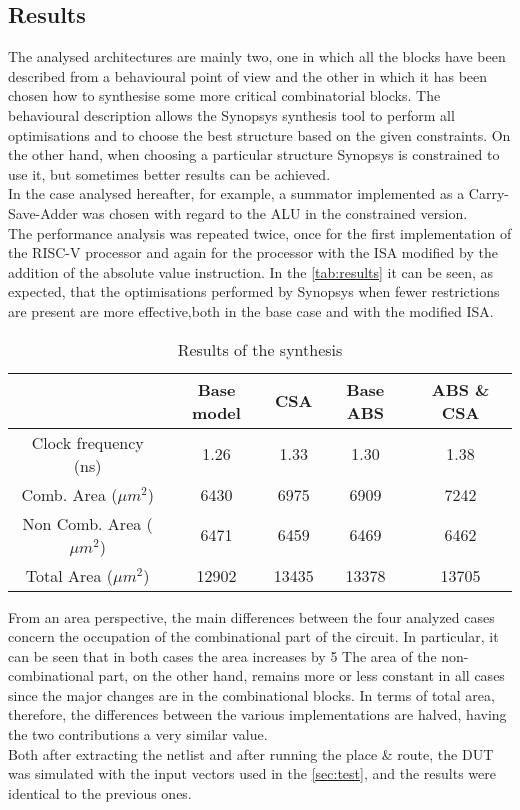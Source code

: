 \subsection{Results}
The analysed architectures are mainly two, one in which all the blocks have been described from a behavioural point of view and the other in which it has been chosen how to synthesise some more critical combinatorial blocks. The behavioural description allows the Synopsys synthesis tool to perform all optimisations and to choose the best structure based on the given constraints. On the other hand, when choosing a particular structure Synopsys is constrained to use it, but sometimes better results can be achieved.\\
In the case analysed hereafter, for example, a summator implemented as a Carry-Save-Adder was chosen with regard to the ALU in the constrained version.\\
The performance analysis was repeated twice, once for the first implementation of the RISC-V processor and again for the processor with the ISA modified by the addition of the absolute value instruction. In the \autoref{tab:results} it can be seen, as expected, that the optimisations performed by Synopsys when fewer restrictions are present are more effective,both in the base case and with the modified ISA.\\
\begin{table}[H]
	\centering
	\begin{tabular}{c|c|c||c|c}
		& Base model & CSA & Base ABS & ABS  \& CSA \\
		\hline
		Clock frequency (ns) & 1.26 & 1.33 & 1.30 & 1.38 \\
		Comb. Area ($\mu m^2$) & 6430 & 6975 & 6909 & 7242 \\
		Non Comb. Area ($\mu m^2$) & 6471 & 6459 & 6469 & 6462 \\
		Total Area ($\mu m^2$)	& 12902 & 13435 & 13378 & 13705 \\
	\end{tabular}
	\caption{Results of the synthesis}
	\label{tab:results}
\end{table}

\noindent From an area perspective, the main differences between the four analyzed cases concern the occupation of the combinational part of the circuit. In particular, it can be seen that in both cases the area increases by 5%
The area of the non-combinational part, on the other hand, remains more or less constant in all cases since the major changes are in the combinational blocks. In terms of total area, therefore, the differences between the various implementations are halved, having the two contributions a very similar value.\\
Both after extracting the netlist and after running the place \& route, the DUT was simulated with the input vectors used in the \autoref{sec:test}, and the results were identical to the previous ones. 